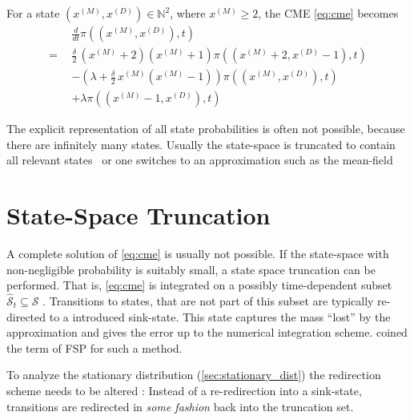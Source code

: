 \begin{example}
\begin{figure}[h!]
\end{figure}

For a state $(x^{(M)}, x^{(D)})\in\mathbb{N}^2$, where $x^{(M)}\geq 2$,
the \ac{CME} \eqref{eq:cme} becomes
\begin{align*}
    & \frac{d}{dt}\pi((x^{(M)}, x^{(D)}), t)\\
    = \;\,&  \frac{\delta}{2} \, (x^{(M)}+2) (x^{(M)} + 1) \pi((x^{(M)}+2, x^{(D)}-1), t)\\
    & - (\lambda + \frac{\delta}{2} \, x^{(M)} (x^{(M)} - 1))\pi((x^{(M)}, x^{(D)}), t)\\
    & + \lambda \pi((x^{(M)}-1, x^{(D)}), t)
\end{align*}
\end{example}

The explicit representation of all state probabilities is often not possible, because
there are infinitely many states. Usually the state-space is truncated to contain all
relevant states~\parencite{andreychenko2011parameter} or one switches to
an approximation such as the mean-field~\parencite{bortolussi2013continuous}


\section{State-Space Truncation}\label{sec:fsp}
A complete solution of \eqref{eq:cme} is usually not possible.
If the state-space with non-negligible probability is suitably small, a state space
truncation can be performed.
That is, \eqref{eq:cme} is integrated on a possibly time-dependent subset
$\hat{\mathcal{S}}_t\subseteq\mathcal{S}$ \parencite{henzinger2009sliding,munsky2006finite,spieler2014numerical}.
Transitions to states, that are not part of this subset are typically re-directed to a introduced sink-state.
This state captures the mass ``lost'' by the approximation and gives the error up to the numerical integration scheme.
\citet{munsky2006finite} coined the term of \acf{FSP} for such a method.

To analyze the stationary distribution (\autoref{sec:stationary_dist}) the redirection scheme needs to be altered \parencite{kuntz2021stationary}:
Instead of a re-redirection into a sink-state, transitions are redirected in \emph{some fashion} back into the truncation set.

